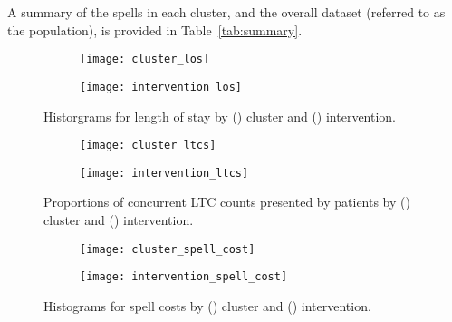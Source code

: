 A summary of the spells in each cluster, and the overall dataset (referred to as
the population), is provided in Table~\ref{tab:summary}. 

\begin{figure}
    \centering
    \begin{subfigure}{\halfimgwidth}
        \texttt{[image: cluster\_los]}
        \caption{}\label{fig:cluster_los}
    \end{subfigure}\hfill%
    \begin{subfigure}{\halfimgwidth}
        \texttt{[image: intervention\_los]}
        \caption{}\label{fig:intervention_los}
    \end{subfigure}
    \caption{%
        Historgrams for length of stay by () cluster and
        () intervention.
    }\label{fig:los_kde}
\end{figure}

\begin{figure}
    \centering
    \begin{subfigure}{\halfimgwidth}
        \texttt{[image: cluster\_ltcs]}
        \caption{}\label{fig:cluster_ltcs}
    \end{subfigure}\hfill%
    \begin{subfigure}{\halfimgwidth}
        \texttt{[image: intervention\_ltcs]}
        \caption{}\label{fig:intervention_ltcs}
    \end{subfigure}
    \caption{%
        Proportions of concurrent LTC counts presented by patients by
        () cluster and ()
        intervention.
    }\label{fig:ltcs}
\end{figure}

\begin{figure}
    \centering
    \begin{subfigure}{\halfimgwidth}
        \texttt{[image: cluster\_spell\_cost]}
        \caption{}\label{fig:cluster_spell_cost}
    \end{subfigure}\hfill%
    \begin{subfigure}{\halfimgwidth}
        \texttt{[image: intervention\_spell\_cost]}
        \caption{}\label{fig:intervention_spell_cost}
    \end{subfigure}
    \caption{%
        Histograms for spell costs by () cluster
        and () intervention.
    }\label{fig:wimd_hist}
\end{figure}

